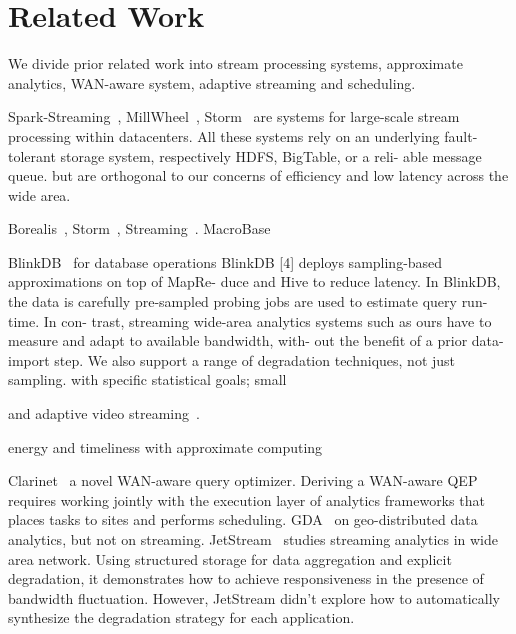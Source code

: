 \section{Related Work}
\label{sec:related-work}

We divide prior related work into stream processing systems, approximate
analytics, WAN-aware system, adaptive streaming and scheduling.

Spark-Streaming~\cite{zaharia2013discretized},
MillWheel~\cite{akidau2013millwheel}, Storm~\cite{toshniwal2014storm} are
systems for large-scale stream processing within datacenters.  All these systems
rely on an underlying fault-tolerant storage system, respectively HDFS,
BigTable, or a reli- able message queue. but are orthogonal to our concerns of
efficiency and low latency across the wide area.

Borealis~\cite{abadi2005design},
Storm~\cite{toshniwal2014storm}, Streaming~\cite{zaharia2013discretized}.
MacroBase


 BlinkDB~\cite{agarwal2013blinkdb} for database
operations BlinkDB [4] deploys sampling-based approximations on top of MapRe-
duce and Hive to reduce latency. In BlinkDB, the data is carefully pre-sampled
probing jobs are used to estimate query run-time. In con- trast, streaming
wide-area analytics systems such as ours have to measure and adapt to available
bandwidth, with- out the benefit of a prior data-import step. We also support a
range of degradation techniques, not just sampling. with specific statistical
goals; small

and adaptive video streaming~\cite{yin2015control}.

energy and timeliness with approximate computing~\cite{farrell2016meantime}

 Clarinet~\cite{viswanathan2016clarinet} a novel WAN-aware
query optimizer. Deriving a WAN-aware QEP requires working jointly with the
execution layer of analytics frameworks that places tasks to sites and performs
scheduling. GDA~\cite{pu2015low} on geo-distributed data analytics, but not on
streaming. JetStream~\cite{rabkin2014aggregation} studies streaming analytics in
wide area network. Using structured storage for data aggregation and explicit
degradation, it demonstrates how to achieve responsiveness in the presence of
bandwidth fluctuation. However, JetStream didn't explore how to automatically
synthesize the degradation strategy for each application.

